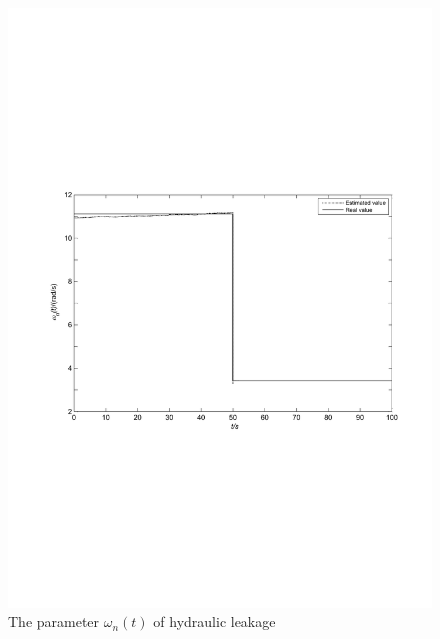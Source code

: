 \documentclass{article}
\begin{document}
\begin{figure}[!htb]
  \centering
  \includegraphics[width=\hsize]{fig5a.pdf}
  \caption{The parameter $\omega_n(t)$ of hydraulic leakage}
  \label{fig:5}
\end{figure}
\end{document}
